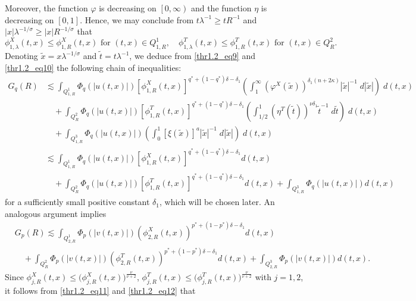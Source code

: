 \documentclass[11pt,reqno]{amsart}
\newcommand{\tron}[1]{\left( #1 \right)}
\numberwithin{equation}{section}
\begin{document}
Moreover, the function $\varphi$ is decreasing on $\left[0,\infty\right)$ and the function $\eta$ is decreasing on $\left[0,1\right]$. Hence, we may conclude from $t\lambda^{-1}\geq tR^{-1}$ and $|x|\lambda^{-1/\sigma}\geq |x|R^{-1/\sigma}$ that
\begin{equation}\label{thr1.2_eq10}
\phi^{X}_{1,\lambda}(t,x)\leq\phi^{X}_{1,R}(t,x) \text{ for } (t,x)\in Q^1_{1,R},\quad \phi^{T}_{1,\lambda}(t,x)\leq\phi^{T}_{1,R}(t,x) \text{ for } (t,x)\in Q^2_{R}.
\end{equation}
Denoting $\tilde{x}=x\lambda^{-1/\sigma}$ and $\tilde{t}=t\lambda^{-1}$, we deduce from \eqref{thr1.2_eq9} and \eqref{thr1.2_eq10} the following chain of inequalities:
\begin{align}
G_q(R) &\lesssim \int_{Q^1_{1,R}}\Phi_q(|u(t,x)|)[  \phi^{X}_{1,R}(t,x)]^{q^*+(1-q^*)\delta-\delta_1}\tron{\int_{1}^{\infty}\left(\varphi^{X}(\tilde{x})\right)^{\delta_1(n+2\kappa)}|\tilde{x}|^{-1}\;d|\tilde{x}|}\;d(t,x)\nonumber\\
&\quad+\int_{Q^2_{R}} \Phi_q(|u(t,x)|)[  \phi^{T}_{1,R}(t,x)]^{q^*+(1-q^*)\delta-\delta_1}\tron{\int_{1/2}^{1}\left(\eta^{T}(\tilde{t})\right)^{\nu\delta_1}\tilde{t}^{-1}\;d\tilde{t}}\;d(t,x)\nonumber\\
&\quad+\int_{Q^3_{1,R}}\Phi_q(|u(t,x)|)\tron{\int_{0}^{1}[\xi(\tilde{x})]^{a}|\tilde{x}|^{-1}\;d|\tilde{x}|}\;d(t,x)\nonumber\\
&\lesssim \int_{Q^1_{1,R}} \Phi_q(|u(t,x)|)[  \phi^{X}_{1,R}(t,x)]^{q^*+(1-q^*)\delta-\delta_1}d(t,x)\nonumber\\
&\quad+\int_{Q^2_{R}} \Phi_q(|u(t,x)|)[  \phi^{T}_{1,R}(t,x)]^{q^*+(1-q^*)\delta-\delta_1}d(t,x)+\int_{Q^3_{1,R}}\Phi_q(|u(t,x)|)d(t,x)\label{thr1.2_eq11}
\end{align}
for a sufficiently small positive constant $\delta_1$, which will be chosen later. An analogous argument implies
\begin{equation}\label{thr1.2_eq12}
\begin{aligned}
&G_p(R)\lesssim \int_{Q^1_{2,R}} \Phi_p(|v(t,x)|)\left(\phi^{X}_{2,R}\left(t,x\right)\right)^{p^*+(1-p^*)\delta-\delta_1}d(t,x)\\
&\quad+\int_{Q^2_{R}} \Phi_p(|v(t,x)|)\left(\phi^{T}_{2,R}\left(t,x\right)\right)^{p^*+(1-p^*)\delta-\delta_1}d(t,x)+\int_{Q^3_{2,R}} \Phi_p(|v(t,x)|)d(t,x).
\end{aligned}
\end{equation}
Since $\phi^X_{j,R}(t,x)\leq \big(\phi^{X}_{j,R}(t,x)\big)^{\frac{\nu}{\nu+2}}$, $\phi^T_{j,R}(t,x)\leq \big(\phi^{T}_{j,R}(t,x)\big)^{\frac{\nu}{\nu+2}}$ with $j=1,2$, it follows from \eqref{thr1.2_eq11} and \eqref{thr1.2_eq12} that
\end{document}
